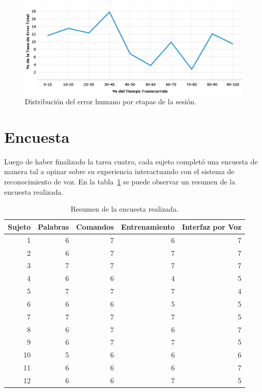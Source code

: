 \begin{figure}[ht]
\centering
\includegraphics[width=0.8\linewidth]{./graphics/error_tiempo.png}
\caption{Distribuci\'on del error humano por etapas de la sesi\'on.}
\label{figure:gerror-tiempo}
\end{figure}


\section{Encuesta}
\label{sec:resultados-encuesta}

Luego de haber finalizado la tarea cuatro, cada sujeto complet\'o una encuesta de manera tal a
opinar sobre su experiencia interactuando con el sistema de reconocimiento de voz. 
En la tabla~\ref{sec:tabla-encuesta} se puede observar un resumen de la encuesta realizada.


\begin{table}[H] 
\centering
\footnotesize
\begin{tabular}{|r|r|r|r|r|}
\hline
    Sujeto & Palabras & Comandos & Entrenamiento & Interfaz por Voz \\
    \hline
    1 & 6 & 7 & 6 & 7 \\
    2 & 6 & 7 & 7 & 7 \\
    3 & 7 & 7 & 7 & 7 \\
    4 & 6 & 6 & 4 & 5 \\
    5 & 7 & 7 & 7 & 4 \\
    6 & 6 & 6 & 5 & 5 \\
    7 & 7 & 7 & 7 & 5 \\
    8 & 6 & 7 & 6 & 7  \\
    9 & 6 & 7 & 7 & 5  \\
    10 & 5 & 6 & 6 & 6  \\
    11 & 6 & 6 & 6 & 7  \\
    12 & 6 & 6 & 7 & 5  \\
\hline
\end{tabular}
\caption{Resumen de la encuesta realizada.}
\label{sec:tabla-encuesta}
\end{table}

